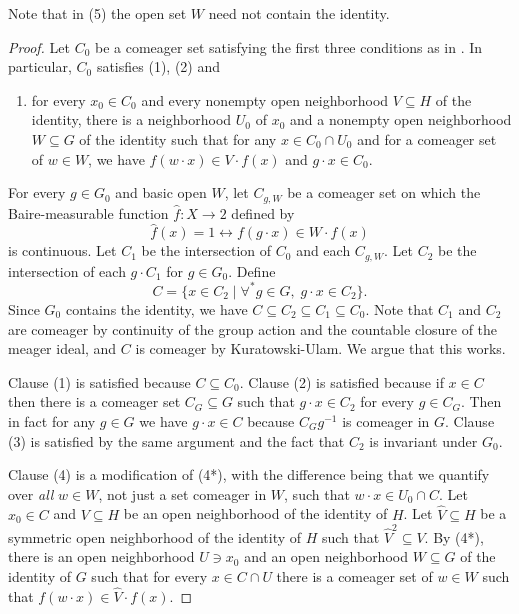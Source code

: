 \documentclass[12pt]{amsart}
\theoremstyle{plain}
\theoremstyle{definition}
\begin{document}
Note that in (5) the open set $W$ need not contain the identity.

\begin{proof}
Let $C_0$ be a comeager set satisfying the first three conditions as in \cite[Lemma 2.5]{LupiniPanagio2018}. 
In particular, $C_0$ satisfies (1), (2) and
\begin{enumerate}
\item[(4*)]  for every $x_0 \in C_0$ and every nonempty open neighborhood $V \subseteq H$ of the identity, there is a neighborhood $U_0$ of $x_0$ and a nonempty open neighborhood $W \subseteq G$ of the identity such that for any $x \in C_0 \cap U_0$ and for a comeager set of $w \in W$, we have $f(w \cdot x) \in V \cdot f(x)$ and $g \cdot x \in C_0$.
\end{enumerate}
For every $g \in G_0$ and basic open $W$, let $C_{g, W}$ be a comeager set on which the Baire-measurable function $\hat{f} : X \rightarrow 2$ defined by
\[\hat{f}(x) = 1 \leftrightarrow f(g \cdot x) \in W \cdot f(x)\]
is continuous.
Let $C_1$ be the intersection of $C_0$ and each $C_{g, W}$.
Let $C_2$ be the intersection of each $g \cdot C_1$ for $g \in G_0$.
Define
\[C = \{x \in C_2 \mid \forall^*g \in G, \; g \cdot x \in C_2\}.\]
Since $G_0$ contains the identity, we have $C \subseteq C_2 \subseteq C_1 \subseteq C_0$.
Note that $C_1$ and $C_2$ are comeager by continuity of the group action and the countable closure of the meager ideal, and $C$ is comeager by Kuratowski-Ulam.
We argue that this works.

Clause (1) is satisfied because $C \subseteq C_0$.
Clause (2) is satisfied because if $x \in C$ then there is a comeager set $C_G \subseteq G$ such that $g \cdot x \in C_2$ for every $g \in C_G$. Then in fact for any $g \in G$ we have $g \cdot x \in C$ because $C_G g^{-1}$ is comeager in $G$.
Clause (3) is satisfied by the same argument and the fact that $C_2$ is invariant under $G_0$.

Clause (4) is a modification of (4*), with the difference being that we quantify over \emph{all} $w \in W$, not just a set comeager in $W$, such that $w \cdot x \in U_0 \cap C$.
Let $x_0 \in C$ and $V \subseteq H$ be an open neighborhood of the identity of $H$.
Let $\hat{V} \subseteq H$ be a symmetric open neighborhood of the identity of $H$ such that $\hat{V}^2 \subseteq V$.
By (4*), there is an open neighborhood $U \ni x_0$ and an open neighborhood $W \subseteq G$ of the identity of $G$ such that for every $x \in C \cap U$ there is a comeager set of $w \in W$ such that $f(w \cdot x) \in \hat{V} \cdot f(x)$.


\end{proof}
\end{document}
